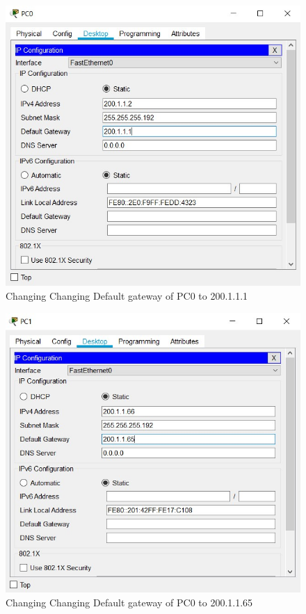 \documentclass[a4paper,11pt]{article}
\begin{document}
\begin{enumerate}
          \begin{figure}[H]
              \centering
              \includegraphics[scale=0.82,cframe=blue 0.5pt 3pt]{./FIG/C_DP0.jpg}
              \caption{Changing Changing Default gateway of PC0 to 200.1.1.1 }
          \end{figure}

          \begin{figure}[H]
              \centering
              \includegraphics[scale=0.82,cframe=blue 0.5pt 3pt]{./FIG/C_DP1.jpg}
              \caption{Changing Changing Default gateway of PC0 to 200.1.1.65 }
          \end{figure}


\end{enumerate}
\end{document}
